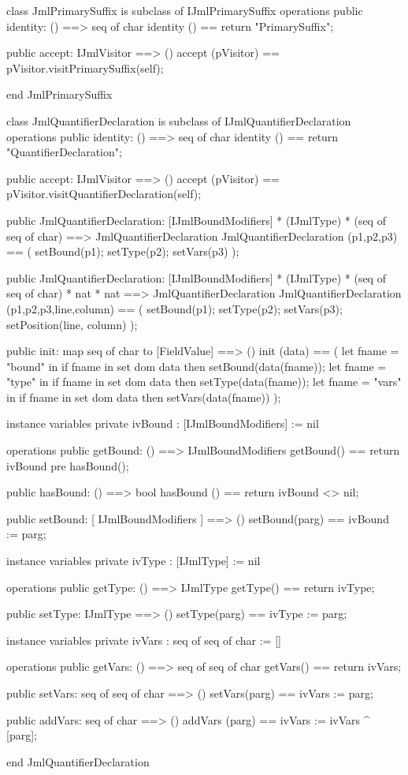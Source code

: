 \begin{vdm_al}
class JmlPrimarySuffix is subclass of IJmlPrimarySuffix
operations
  public identity: () ==> seq of char
  identity () == return "PrimarySuffix";

  public accept: IJmlVisitor ==> ()
  accept (pVisitor) == pVisitor.visitPrimarySuffix(self);

end JmlPrimarySuffix
\end{vdm_al}
\begin{vdm_al}
class JmlQuantifierDeclaration is subclass of IJmlQuantifierDeclaration
operations
  public identity: () ==> seq of char
  identity () == return "QuantifierDeclaration";

  public accept: IJmlVisitor ==> ()
  accept (pVisitor) == pVisitor.visitQuantifierDeclaration(self);

  public JmlQuantifierDeclaration:
    [IJmlBoundModifiers] *
    (IJmlType) *
    (seq of seq of char) ==> JmlQuantifierDeclaration
  JmlQuantifierDeclaration (p1,p2,p3) == 
    ( setBound(p1);
      setType(p2);
      setVars(p3) );

  public JmlQuantifierDeclaration:
    [IJmlBoundModifiers] *
    (IJmlType) *
    (seq of seq of char) *
    nat *
    nat ==> JmlQuantifierDeclaration
  JmlQuantifierDeclaration (p1,p2,p3,line,column) == 
    ( setBound(p1);
      setType(p2);
      setVars(p3);
      setPosition(line, column) );

  public init: map seq of char to [FieldValue] ==> ()
  init (data) ==
    ( let fname = "bound" in
        if fname in set dom data
        then setBound(data(fname));
      let fname = "type" in
        if fname in set dom data
        then setType(data(fname));
      let fname = "vars" in
        if fname in set dom data
        then setVars(data(fname)) );

instance variables
  private ivBound : [IJmlBoundModifiers] := nil

operations
  public getBound: () ==> IJmlBoundModifiers
  getBound() == return ivBound
    pre hasBound();

  public hasBound: () ==> bool
  hasBound () == return ivBound <> nil;

  public setBound: [ IJmlBoundModifiers ] ==> ()
  setBound(parg) == ivBound := parg;

instance variables
  private ivType : [IJmlType] := nil

operations
  public getType: () ==> IJmlType
  getType() == return ivType;

  public setType: IJmlType ==> ()
  setType(parg) == ivType := parg;

instance variables
  private ivVars : seq of seq of char := []

operations
  public getVars: () ==> seq of seq of char
  getVars() == return ivVars;

  public setVars: seq of seq of char ==> ()
  setVars(parg) == ivVars := parg;

  public addVars: seq of char ==> ()
  addVars (parg) == ivVars := ivVars ^ [parg];

end JmlQuantifierDeclaration
\end{vdm_al}

